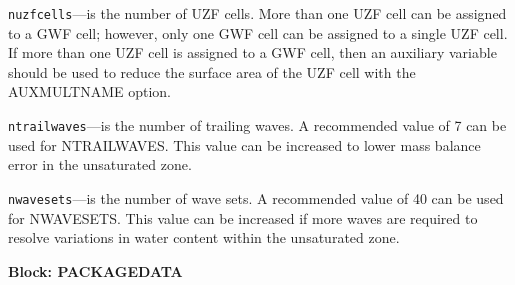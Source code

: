 \begin{description}
\item \texttt{nuzfcells}---is the number of UZF cells.  More than one UZF cell can be assigned to a GWF cell; however, only one GWF cell can be assigned to a single UZF cell. If more than one UZF cell is assigned to a GWF cell, then an auxiliary variable should be used to reduce the surface area of the UZF cell with the AUXMULTNAME option.

\item \texttt{ntrailwaves}---is the number of trailing waves.  A recommended value of 7 can be used for NTRAILWAVES.  This value can be increased to lower mass balance error in the unsaturated zone.

\item \texttt{nwavesets}---is the number of wave sets.  A recommended value of 40 can be used for NWAVESETS.  This value can be increased if more waves are required to resolve variations in water content within the unsaturated zone.

\end{description}
\item \textbf{Block: PACKAGEDATA}

